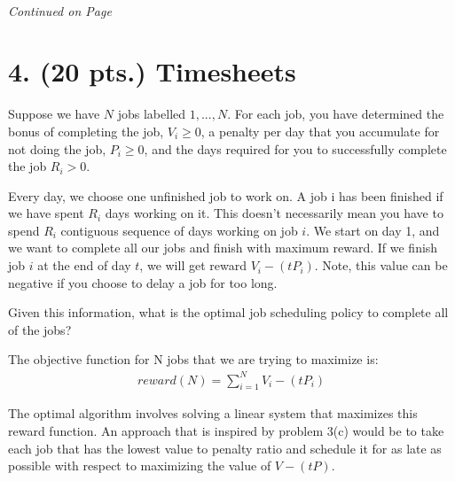 \documentclass[11pt]{article}
\begin{document}
 \paragraph{} \emph{Continued on Page \pageref{pg:p3-continuation}}

\newpage

\section*{4. (20 pts.) Timesheets}

Suppose we have $N$ jobs labelled $1,...,N$. For each job, you have determined the
bonus of completing the job, $V_i \geq 0$, a penalty per day that you accumulate
for not doing the job, $P_i \geq 0$, and the days required for you to successfully 
complete the job $R_i > 0$.

Every day, we choose one unfinished job to work on. A job i has been finished if we
 have spent $R_i$ days working on it. This doesn't necessarily mean you have to spend
 $R_i$ contiguous sequence of days working on job $i$. We start on day 1, and we want
 to complete all our jobs and finish with maximum reward. If we finish job $i$ at the
 end of day $t$, we will get reward $V_i - (tP_i)$. Note, this value can be negative 
if you choose to delay a job for too long.

Given this information, what is the optimal job scheduling policy to complete all of the jobs?

The objective function for N jobs that we are trying to maximize is:
\begin{equation*}
  \begin{align}
    reward(N)=\sum_{i=1}^{N}{V_i-(tP_i)}
  \end{align}
\end{equation*}

The optimal algorithm involves solving a linear system that maximizes this reward function.
An approach that is inspired by problem 3(c) would be to take each job that has the lowest value to penalty ratio
and schedule it for as late as possible with respect to maximizing the value of $V-(tP)$.
\label{pg:end-of-p4}

%
\end{document}
